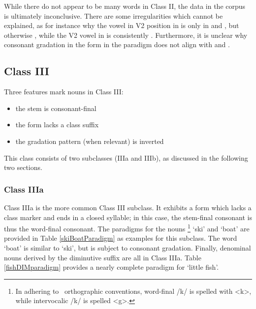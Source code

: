While there do not appear to be many words in Class II, the data in the corpus is ultimately inconclusive. %
There are some irregularities which cannot be explained, as for instance 
why the vowel in V2 position in  is only  in  and , but otherwise , while the V2 vowel in  is consistently . Furthermore, it is unclear why consonant gradation in the  form in the  paradigm does not align with  and . %


\FB


\subsection{Class III}\label{NclassIII}
Three features mark nouns in Class III: 
\begin{itemize}
\item{the stem is consonant-final}
\item{the  form lacks a class suffix}
\item{the gradation pattern (when relevant) is inverted}
\end{itemize}
This class consists of two subclasses (IIIa and IIIb), as discussed in the following two sections. 


\subsubsection{Class IIIa}\label{NclassIIIa}
Class IIIa is the more common Class III subclass. It exhibits a  form which lacks a class marker and ends in a closed syllable; in this case, the stem-final consonant is thus the word-final consonant. 
The paradigms for the nouns \footnote{In adhering to \PS\ orthographic conventions, word-final /k/ is spelled with <k>, while intervocalic /k/ is spelled <g>.} 
‘ski’ and  ‘boat’ are provided in Table \vref{skiBoatParadigm} %
as examples for this subclass. %
The word  ‘boat’ is similar to  ‘ski’, but is subject to consonant gradation. %
Finally, denominal nouns derived by the diminutive suffix  are all in Class IIIa. Table \vref{fishDIMparadigm} provides a nearly complete paradigm for  ‘little fish’. 

